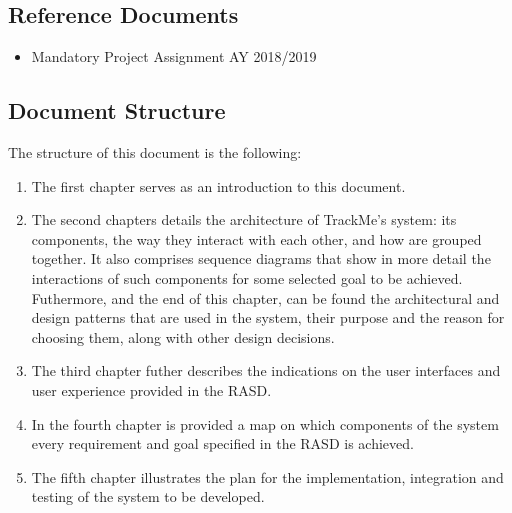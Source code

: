 \documentclass[../main.tex]{subfiles}
\begin{document}
\subsection{Reference Documents}

\begin{itemize}

	\item{Mandatory Project Assignment AY 2018/2019}

\end{itemize}

\subsection{Document Structure}

The structure of this document is the following:

\begin{enumerate}

	\item The first chapter serves as an introduction to this document.
	\item The second chapters details the architecture of TrackMe's system: its components, the way they interact with each other, and how are grouped together. It also comprises sequence diagrams that show in more detail the interactions of such components for some selected goal to be achieved. Futhermore, and the end of this chapter, can be found the architectural and design patterns that are used in the system, their purpose and the reason for choosing them, along with other design decisions.
	\item The third chapter futher describes the indications on the user interfaces and user experience provided in the RASD.
	\item In the fourth chapter is provided a map on which components of the system every requirement and goal specified in the RASD is achieved.
	\item The fifth chapter illustrates the plan for the implementation, integration and testing of the system to be developed.

\end{enumerate}
\end{document}
